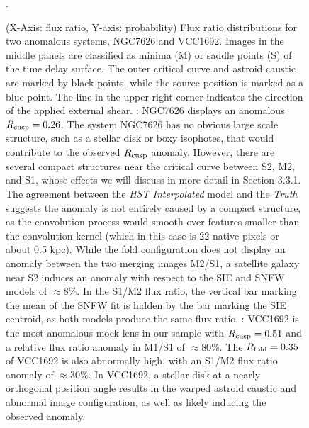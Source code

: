 \begin{figure}
	\caption{\label{fig:fluxratios} (X-Axis: flux ratio, Y-axis: probability) \newline Flux ratio distributions for two anomalous systems, NGC7626 and VCC1692. Images in the middle panels are classified as minima (M) or saddle points (S) of the time delay surface. The outer critical curve and astroid caustic are marked by black points, while the source position is marked as a blue point. The line in the upper right corner indicates the direction of the applied external shear. : NGC7626 displays an anomalous $R_{\rm{cusp}} = 0.26$. The system NGC7626 has no obvious large scale structure, such as a stellar disk or boxy isophotes, that would contribute to the observed $R_{\rm{cusp}}$ anomaly. However, there are several compact structures near the critical curve between S2, M2, and S1, whose effects we will discuss in more detail in Section 3.3.1. The agreement between the \textit{HST Interpolated} model and the \textit{Truth} suggests the anomaly is not entirely caused by a compact structure, as the convolution process would smooth over features smaller than the convolution kernel (which in this case is 22 native pixels or about 0.5 kpc). While the fold configuration does not display an anomaly between the two merging images M2/S1, a satellite galaxy near S2 induces an anomaly with respect to the SIE and SNFW models of $\approx 8 \%$. In the S1/M2 flux ratio, the vertical bar marking the mean of the SNFW fit is hidden by the bar marking the SIE centroid, as both models produce the same flux ratio. : VCC1692 is the most anomalous mock lens in our sample with $R_{\rm{cusp}} = 0.51$ and a relative flux ratio anomaly in M1/S1 of $\approx 80 \%$. The $R_{\rm{fold}} = 0.35$ of VCC1692 is also abnormally high, with an S1/M2 flux ratio anomaly of $\approx 30 \%$. In VCC1692, a stellar disk at a nearly orthogonal position angle results in the warped astroid caustic and abnormal image configuration, as well as likely inducing the observed anomaly.}. 
\end{figure}
